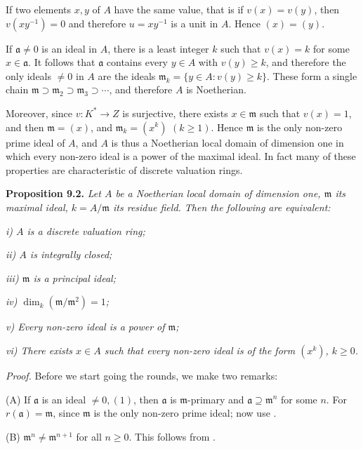 If two elements \(x,y\) of \(A\) have the same value, that is if \(v(x)=v(y)\), then \(v(xy^{-1})=0\) and therefore \(u=xy^{-1}\) is a unit in \(A\). Hence \((x)=(y)\).

If \(\mathfrak a\neq0\) is an ideal in \(A\), there is a least integer \(k\) such that \(v(x)=k\) for some \(x\in\mathfrak a\). It follows that \(\mathfrak a\) contains every \(y\in A\) with \(v(y)\geq k\), and therefore the only ideals \(\neq0\) in \(A\) are the ideals \(\mathfrak m_k=\{y\in A:v(y)\geq k\}\). These form a single chain \(\mathfrak m\supset\mathfrak m_2\supset\mathfrak m_3\supset\cdots\), and therefore \(A\) is Noetherian.

Moreover, since \(v:K^*\to Z\) is surjective, there exists \(x\in\mathfrak m\) such that \(v(x)=1\), and then \(\mathfrak m=(x)\), and \(\mathfrak m_k=(x^k)\) \((k\geq1)\). Hence \(\mathfrak m\) is the only non-zero prime ideal of \(A\), and \(A\) is thus a Noetherian local domain of dimension one in which every non-zero ideal is a power of the maximal ideal. In fact many of these properties are characteristic of discrete valuation rings.

\noindent\textbf{Proposition 9.2.} \emph{Let \(A\) be a Noetherian local domain of dimension one, \(\mathfrak m\) its maximal ideal, \(k=A/\mathfrak m\) its residue field. Then the following are equivalent:}

\emph{i) \(A\) is a discrete valuation ring;}

\emph{ii) \(A\) is integrally closed;}

\emph{iii) \(\mathfrak m\) is a principal ideal;}

\emph{iv) \(\dim_k(\mathfrak m/\mathfrak m^2)=1\);}

\emph{v) Every non-zero ideal is a power of \(\mathfrak m\);}

\emph{vi) There exists \(x\in A\) such that every non-zero ideal is of the form \((x^k)\), \(k\geq0\).}

\noindent\emph{Proof.} Before we start going the rounds, we make two remarks:

(A) If \(\mathfrak a\) is an ideal \(\neq0,(1)\), then \(\mathfrak a\) is \(\mathfrak m\)-primary and \(\mathfrak a\supseteq\mathfrak m^n\) for some \(n\). For \(r(\mathfrak a)=\mathfrak m\), since \(\mathfrak m\) is the only non-zero prime ideal; now use .

(B) \(\mathfrak m^n\neq\mathfrak m^{n+1}\) for all \(n\geq0\). This follows from .

